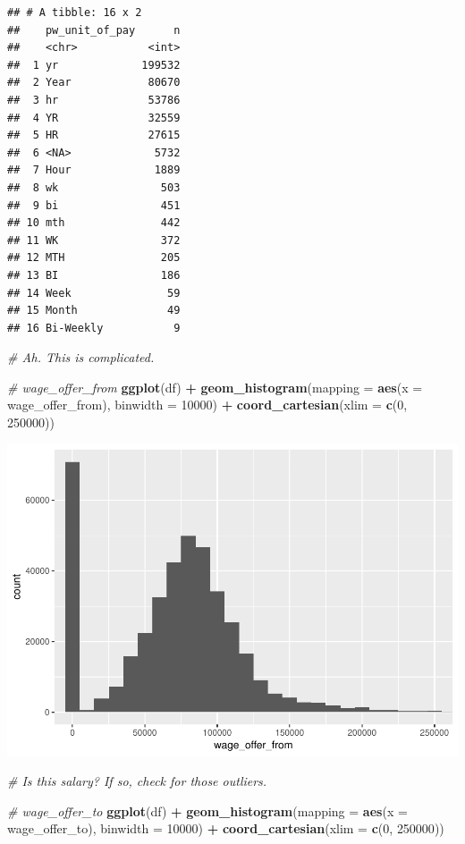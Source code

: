 \documentclass[]{article}
\newenvironment{Shaded}{\begin{snugshade}}{\end{snugshade}}
\newcommand{\KeywordTok}[1]{\textcolor[rgb]{0.13,0.29,0.53}{\textbf{#1}}}
\newcommand{\DataTypeTok}[1]{\textcolor[rgb]{0.13,0.29,0.53}{#1}}
\newcommand{\DecValTok}[1]{\textcolor[rgb]{0.00,0.00,0.81}{#1}}
\newcommand{\StringTok}[1]{\textcolor[rgb]{0.31,0.60,0.02}{#1}}
\newcommand{\CommentTok}[1]{\textcolor[rgb]{0.56,0.35,0.01}{\textit{#1}}}
\newcommand{\OperatorTok}[1]{\textcolor[rgb]{0.81,0.36,0.00}{\textbf{#1}}}
\newcommand{\NormalTok}[1]{#1}
\begin{document}
\begin{verbatim}
## # A tibble: 16 x 2
##    pw_unit_of_pay      n
##    <chr>           <int>
##  1 yr             199532
##  2 Year            80670
##  3 hr              53786
##  4 YR              32559
##  5 HR              27615
##  6 <NA>             5732
##  7 Hour             1889
##  8 wk                503
##  9 bi                451
## 10 mth               442
## 11 WK                372
## 12 MTH               205
## 13 BI                186
## 14 Week               59
## 15 Month              49
## 16 Bi-Weekly           9
\end{verbatim}

\begin{Shaded}
\begin{Highlighting}[]
\CommentTok{# Ah. This is complicated. }

\CommentTok{# wage_offer_from}
\KeywordTok{ggplot}\NormalTok{(df) }\OperatorTok{+}\StringTok{ }
\StringTok{  }\KeywordTok{geom_histogram}\NormalTok{(}\DataTypeTok{mapping =} \KeywordTok{aes}\NormalTok{(}\DataTypeTok{x =}\NormalTok{ wage_offer_from), }\DataTypeTok{binwidth =} \DecValTok{10000}\NormalTok{) }\OperatorTok{+}
\StringTok{  }\KeywordTok{coord_cartesian}\NormalTok{(}\DataTypeTok{xlim =} \KeywordTok{c}\NormalTok{(}\DecValTok{0}\NormalTok{, }\DecValTok{250000}\NormalTok{))}
\end{Highlighting}
\end{Shaded}

\includegraphics{Report_Dummy_files/figure-latex/variable-specific exploratory data analysis-3.pdf}

\begin{Shaded}
\begin{Highlighting}[]
\CommentTok{# Is this salary? If so, check for those outliers. }

\CommentTok{# wage_offer_to}
\KeywordTok{ggplot}\NormalTok{(df) }\OperatorTok{+}\StringTok{ }
\StringTok{  }\KeywordTok{geom_histogram}\NormalTok{(}\DataTypeTok{mapping =} \KeywordTok{aes}\NormalTok{(}\DataTypeTok{x =}\NormalTok{ wage_offer_to), }\DataTypeTok{binwidth =} \DecValTok{10000}\NormalTok{) }\OperatorTok{+}
\StringTok{  }\KeywordTok{coord_cartesian}\NormalTok{(}\DataTypeTok{xlim =} \KeywordTok{c}\NormalTok{(}\DecValTok{0}\NormalTok{, }\DecValTok{250000}\NormalTok{))}
\end{Highlighting}
\end{Shaded}
\end{document}
